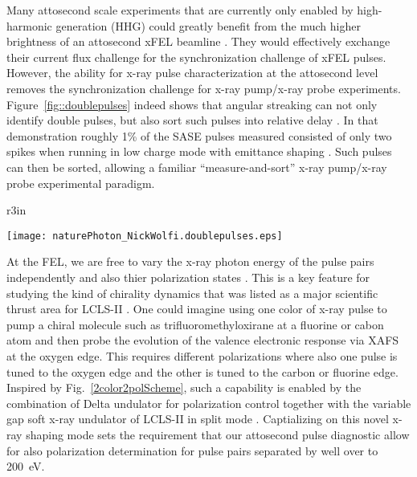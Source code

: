 Many attosecond scale experiments that are currently only enabled by high-harmonic generation (HHG)\cite{Lewenstein1994,Hentschel2001,attoclock2008,Chen2014,Biegert2014,Schmidt2016,Biegert2016,WornerSci2017,Zenghu2017} could greatly benefit from the much higher brightness of an attosecond xFEL beamline \cite{Ding2009,Xiang2009,xLEAP}.
They would effectively exchange their current flux challenge for the synchronization challenge of xFEL pulses.
However, the ability for x-ray pulse characterization at the attosecond level removes the synchronization challenge for x-ray pump/x-ray probe experiments.
Figure~\ref{fig::doublepulses} indeed shows that angular streaking can not only identify double pulses, but also sort such pulses into relative delay \cite{Nick2018}.
In that demonstration roughly 1\% of the SASE pulses measured consisted of only two spikes when running in low charge mode with emittance shaping \cite{EmmaFoil,Ding2015}.
Such pulses can then be sorted, allowing a familiar ``measure-and-sort'' x-ray pump/x-ray probe experimental paradigm.

\begin{wrapfigure}[12]{r}{3in}
\centerline{\texttt{[image: naturePhoton\_NickWolfi.doublepulses.eps]}}
\vspace{-0.5\baselineskip}
\caption{\label{fig::doublepulses}Reproduced from Ref.~\cite{Nick2018}.
}
\end{wrapfigure}

At the FEL, we are free to vary the x-ray photon energy of the pulse pairs independently \cite{Lutman13_twocolor,LutmanFreshSlice2016} and also thier polarization states \cite{Lutman2016,Dichroism2016}.
This is a key feature for studying the kind of chirality dynamics that was listed as a major scientific thrust area for LCLS-II \cite{lcls2_opportunities}.
One could imagine using one color of x-ray pulse to pump a chiral molecule such as trifluoromethyloxirane \cite{Ilchen2017} at a fluorine or cabon atom and then probe the evolution of the valence electronic response via XAFS at the oxygen edge.
This requires different polarizations \cite{Lutman2016,Dichroism2016} where also one pulse is tuned to the oxygen edge and the other is tuned to the carbon or fluorine edge.
Inspired by Fig.~\ref{2color2polScheme}, such a capability is enabled by the combination of Delta undulator for polarization control together with the variable gap soft x-ray undulator of LCLS-II in split mode \cite{Lutman13_twocolor,LutmanFreshSlice2016}.
Captializing on this novel x-ray shaping mode sets the requirement that our attosecond pulse diagnostic allow for also polarization determination for pulse pairs separated by well over to 200~eV.

